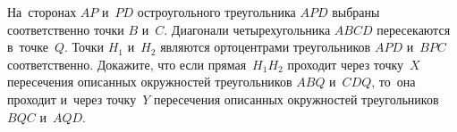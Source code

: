 \begin{problems}
\item
На~сторонах $AP$ и~$PD$ остроугольного треугольника $APD$ выбраны
соответственно точки $B$ и~$C$.
Диагонали четырехугольника $ABCD$ пересекаются в~точке~$Q$.
Точки $H_1$ и~$H_2$ являются ортоцентрами треугольников $APD$ и~$BPC$
соответственно.
Докажите, что если прямая~$H_1 H_2$ проходит через точку~$X$ пересечения
описанных окружностей треугольников $ABQ$ и~$CDQ$, то~она проходит и~через
точку~$Y$ пересечения описанных окружностей треугольников $BQC$ и~$AQD$.

\end{problems}

